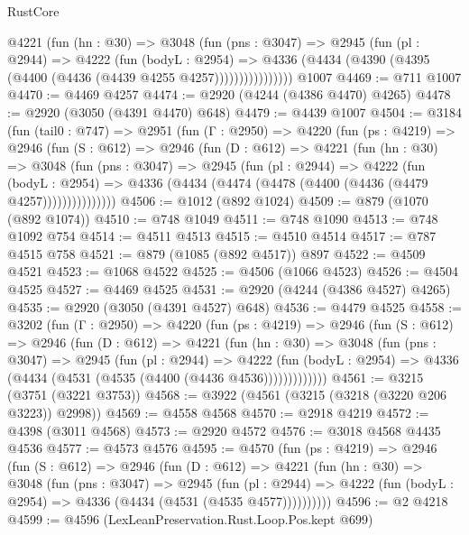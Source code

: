 \begin{lexlean}{RustCore}
\begin{coremodule}
              @4221
                (fun (hn : @30) =>
                @3048
                  (fun (pns : @3047) =>
                  @2945
                    (fun (pl : @2944) =>
                    @4222
                      (fun (bodyL : @2954) =>
                      @4336 (@4434 (@4390 (@4395 (@4400 (@4436 (@4439 @4255 @4257))))))))))))))))
    @1007
@4469 := @711 @1007
@4470 := @4469 @4257
@4474 := @2920 (@4244 (@4386 @4470) @4265)
@4478 := @2920 (@3050 (@4391 @4470) @648)
@4479 := @4439 @1007
@4504 := @3184
    (fun (tail0 : @747) =>
    @2951
      (fun (Γ : @2950) =>
      @4220
        (fun (ps : @4219) =>
        @2946
          (fun (S : @612) =>
          @2946
            (fun (D : @612) =>
            @4221
              (fun (hn : @30) =>
              @3048
                (fun (pns : @3047) =>
                @2945
                  (fun (pl : @2944) =>
                  @4222
                    (fun (bodyL : @2954) =>
                    @4336 (@4434 (@4474 (@4478 (@4400 (@4436 (@4479 @4257)))))))))))))))
@4506 := @1012 (@892 @1024)
@4509 := @879 (@1070 (@892 @1074))
@4510 := @748 @1049
@4511 := @748 @1090
@4513 := @748 @1092 @754
@4514 := @4511 @4513
@4515 := @4510 @4514
@4517 := @787 @4515 @758
@4521 := @879 (@1085 (@892 @4517)) @897
@4522 := @4509 @4521
@4523 := @1068 @4522
@4525 := @4506 (@1066 @4523)
@4526 := @4504 @4525
@4527 := @4469 @4525
@4531 := @2920 (@4244 (@4386 @4527) @4265)
@4535 := @2920 (@3050 (@4391 @4527) @648)
@4536 := @4479 @4525
@4558 := @3202
    (fun (Γ : @2950) =>
    @4220
      (fun (ps : @4219) =>
      @2946
        (fun (S : @612) =>
        @2946
          (fun (D : @612) =>
          @4221
            (fun (hn : @30) =>
            @3048
              (fun (pns : @3047) =>
              @2945
                (fun (pl : @2944) =>
                @4222
                  (fun (bodyL : @2954) =>
                  @4336 (@4434 (@4531 (@4535 (@4400 (@4436 @4536)))))))))))))
@4561 := @3215 (@3751 (@3221 @3753))
@4568 := @3922 (@4561 (@3215 (@3218 (@3220 @206 @3223)) @2998))
@4569 := @4558 @4568
@4570 := @2918 @4219
@4572 := @4398 (@3011 @4568)
@4573 := @2920 @4572
@4576 := @3018 @4568 @4435 @4536
@4577 := @4573 @4576
@4595 := @4570
    (fun (ps : @4219) =>
    @2946
      (fun (S : @612) =>
      @2946
        (fun (D : @612) =>
        @4221
          (fun (hn : @30) =>
          @3048
            (fun (pns : @3047) =>
            @2945
              (fun (pl : @2944) =>
              @4222 (fun (bodyL : @2954) => @4336 (@4434 (@4531 (@4535 @4577))))))))))
@4596 := @2 @4218
@4599 := @4596 (LexLeanPreservation.Rust.Loop.Pos.kept @699)

\end{coremodule}
\end{lexlean}
